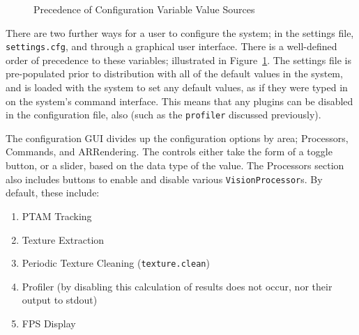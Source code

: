 \documentclass[a4paper,10pt]{article}
\begin{document}
\begin{figure}[h]
  \begin{center}
  \end{center}
  \caption{Precedence of Configuration Variable Value Sources}
  \label{configprecedence}
\end{figure}

There are two further ways for a user to configure the system; in the settings file, \texttt{settings.cfg}, and through a graphical user interface. There is a well-defined order of precedence to these variables; illustrated in Figure~\ref{configprecedence}. The settings file is pre-populated prior to distribution with all of the default values in the system, and is loaded with the system to set any default values, as if they were typed in on the system's command interface. This means that any plugins can be disabled in the configuration file, also (such as the \texttt{profiler} discussed previously).

The configuration GUI divides up the configuration options by area; Processors, Commands, and ARRendering. The controls either take the form of a toggle button, or a slider, based on the data type of the value. The Processors section also includes buttons to enable and disable various \texttt{VisionProcessor}s. By default, these include:

\begin{enumerate}
\item{PTAM Tracking}
\item{Texture Extraction}
\item{Periodic Texture Cleaning (\texttt{texture.clean})}
\item{Profiler (by disabling this calculation of results does not occur, nor their output to stdout)}
\item{FPS Display}
\end{enumerate}
\end{document}

